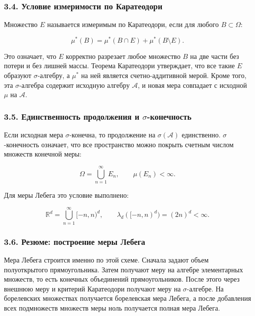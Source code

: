 \documentclass[
  11pt,
  a4paper,
]{article}
\begin{document}
\subsubsection{3.4. Условие измеримости по
Каратеодори}\label{ux443ux441ux43bux43eux432ux438ux435-ux438ux437ux43cux435ux440ux438ux43cux43eux441ux442ux438-ux43fux43e-ux43aux430ux440ux430ux442ux435ux43eux434ux43eux440ux438}

Множество \(E\) называется измеримым по Каратеодори, если для любого
\(B\subset\Omega\):

\[
\mu^*(B)=\mu^*(B\cap E)+\mu^*(B\setminus E).
\]

Это означает, что \(E\) корректно разрезает любое множество \(B\) на две
части без потери и без лишней массы. Теорема Каратеодори утверждает, что
все такие \(E\) образуют \(\sigma\)-алгебру, а \(\mu^*\) на ней является
счетно-аддитивной мерой. Кроме того, эта \(\sigma\)-алгебра содержит
исходную алгебру \(\mathcal A\), и новая мера совпадает с исходной
\(\mu\) на \(\mathcal A\).

\subsubsection{\texorpdfstring{3.5. Единственность продолжения и
\(\sigma\)-конечность}{3.5. Единственность продолжения и \textbackslash sigma-конечность}}\label{ux435ux434ux438ux43dux441ux442ux432ux435ux43dux43dux43eux441ux442ux44c-ux43fux440ux43eux434ux43eux43bux436ux435ux43dux438ux44f-ux438-sigma-ux43aux43eux43dux435ux447ux43dux43eux441ux442ux44c}

Если исходная мера \(\sigma\)-конечна, то продолжение на
\(\sigma(\mathcal A)\) единственно. \(\sigma\)-конечность означает, что
все пространство можно покрыть счетным числом множеств конечной меры:

\[
\Omega=\bigcup_{n=1}^{\infty}E_n,
\qquad
\mu(E_n)<\infty.
\]

Для меры Лебега это условие выполнено:

\[
\mathbb R^d=\bigcup_{n=1}^{\infty}[-n,n)^d,
\qquad
\lambda_d([-n,n)^d)=(2n)^d<\infty.
\]

\subsubsection{3.6. Резюме: построение меры
Лебега}\label{ux440ux435ux437ux44eux43cux435-ux43fux43eux441ux442ux440ux43eux435ux43dux438ux435-ux43cux435ux440ux44b-ux43bux435ux431ux435ux433ux430}

Мера Лебега строится именно по этой схеме. Сначала задают объем
полуоткрытого прямоугольника. Затем получают меру на алгебре
элементарных множеств, то есть конечных объединений прямоугольников.
После этого через внешнюю меру и критерий Каратеодори получают меру на
\(\sigma\)-алгебре. На борелевских множествах получается борелевская
мера Лебега, а после добавления всех подмножеств множеств меры ноль
получается полная мера Лебега.
\end{document}
